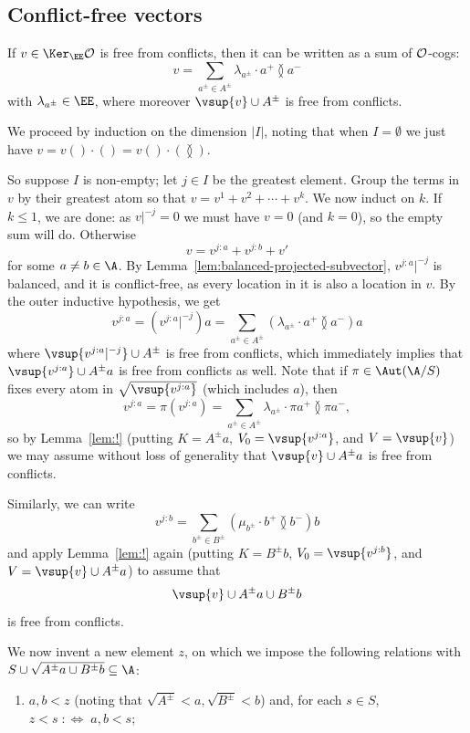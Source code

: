 \subsection{Conflict-free vectors}\label{subsec:unobstructed}
\begin{claim}\label{claim:!-free-decomposition}
    If $v \in \Ker_\EE \cal O$ is free from conflicts, then it can be written as a sum of $\cal O$-cogs:
    \[
        v = \sum_{a^\pm \in A^\pm} \lambda_{a^\pm} \cdot a^+ \between a^-
    \]
    with $\lambda_{a^\pm} \in \EE$, where moreover $\vsup{v} \cup A^\pm$ is free from conflicts.
\end{claim}
\begin{claimproof}
We proceed by induction on the dimension $|I|$, 
noting that when $I = \emptyset$ we just have $v = v() \cdot () = v() \cdot ( \between )$.

So suppose $I$ is non-empty; let $j \in I$ be the greatest element. 
Group the terms in $v$ by their greatest atom so that $v = v^1 + v^2 + \cdots + v^k$.
We now induct on $k$.
If $k \leq 1$, we are done: as $v|^{-j} = 0$ we must have $v = 0$ (and $k = 0$), so the empty sum will do.
Otherwise \[
    v = v^{j:a} + v^{j:b} + v'
\]
for some $a\neq b\in \A$. By Lemma~\ref{lem:balanced-projected-subvector}, $v^{j:a}|^{-j}$ is balanced, and it is conflict-free, as every location in it is also a location in $v$.
By the outer inductive hypothesis, we get \[
    v^{j:a} = (v^{j:a}|^{-j}) a = \sum_{a^\pm\in A^\pm} (\lambda_{a^\pm} \cdot a^+ \between a^-)a
\]
where $\vsup{v^{j:a}|^{-j}}\cup A^\pm$ is free from conflicts, which immediately implies that $\vsup{v^{j:a}}\cup A^\pm a$ is free from conflicts as well. 
Note that if $\pi \in \Aut(\A/S)$ fixes every atom in $\sqrt{\vsup{v^{j:a}}}$ (which includes $a$), then
\[
    v^{j:a} = \pi(v^{j:a}) = \sum_{a^\pm \in A^\pm} \lambda_{a^\pm} \cdot \pi a^+ \between \pi a^-,
\]
so by Lemma~\ref{lem:!} (putting $K=A^\pm a$, $V_0=\vsup{v^{j:a}}$, and $V=\vsup{v}$) we may assume without loss of generality that
$\vsup{v}\cup A^\pm a$ is free from conflicts.

Similarly, we can write \[
    v^{j:b} = \sum_{b^\pm\in B^\pm} (\mu_{b^\pm} \cdot b^+ \between b^-)b
\]
and apply Lemma~\ref{lem:!} again (putting $K=B^\pm b$, $V_0=\vsup{v^{j:b}}$, and $V=\vsup{v}\cup A^\pm a$) to assume that
\[
    \vsup{v} \cup A^\pm a \cup B^\pm b
\]
is free from conflicts.

We now invent a new element $z$, on which we impose the following relations with $S \cup \sqrt{A^\pm a \cup B^\pm b} \subseteq \A$: 
\begin{enumerate}
    \item $a, b < z$ (noting that $\sqrt{A^\pm} < a, \sqrt{B^\pm} < b$) and, for each $s \in S$, $z < s \;:\Longleftrightarrow\; a, b < s$;
    

\end{enumerate}
\end{claimproof}
